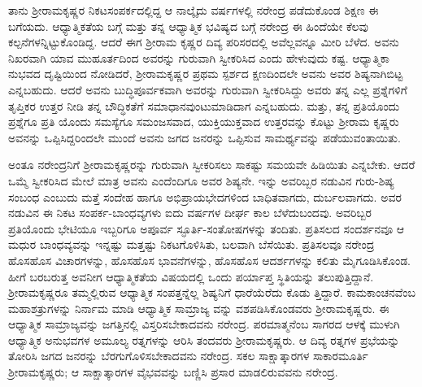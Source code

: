 ತಾನು ಶ್ರೀರಾಮಕೃಷ್ಣರ ನಿಕಟಸಂಪರ್ಕದಲ್ಲಿದ್ದ ಆ ನಾಲ್ಕೈದು ವರ್ಷಗಳಲ್ಲಿ ನರೇಂದ್ರ ಪಡೆದುಕೊಂಡ ಶಿಕ್ಷಣ ಈ ಬಗೆಯದು. ಆಧ್ಯಾತ್ಮಿಕತೆಯ ಬಗ್ಗೆ ಮತ್ತು ತನ್ನ ಆಧ್ಯಾತ್ಮಿಕ ಭವಿಷ್ಯದ ಬಗ್ಗೆ ನರೇಂದ್ರ ಈ ಹಿಂದೆಯೇ ಕೆಲವು ಕಲ್ಪನೆಗಳನ್ನಿಟ್ಟುಕೊಂಡಿದ್ದ. ಆದರೆ ಈಗ ಶ್ರೀರಾಮ ಕೃಷ್ಣರ ದಿವ್ಯ ಪರಿಸರದಲ್ಲಿ ಅವೆಲ್ಲವನ್ನೂ ಮೀರಿ ಬೆಳೆದ. ಅವನು ನಿಖರವಾಗಿ ಯಾವ ಮುಹೂರ್ತದಿಂದ ಅವರನ್ನು ಗುರುವಾಗಿ ಸ್ವೀಕರಿಸಿದ ಎಂದು ಹೇಳುವುದು ಕಷ್ಟ. ಆಧ್ಯಾತ್ಮಿಕಾ ನುಭವದ ದೃಷ್ಟಿಯಿಂದ ನೋಡಿದರೆ, ಶ್ರೀರಾಮಕೃಷ್ಣರ ಪ್ರಥಮ ಸ್ಪರ್ಶದ ಕ್ಷಣದಿಂದಲೇ ಅವನು ಅವರ ಶಿಷ್ಯನಾಗಿಬಿಟ್ಟ ಎನ್ನಬಹುದು. ಆದರೆ ಅವನು ಬುದ್ಧಿಪೂರ್ವಕವಾಗಿ ಅವರನ್ನು ಗುರುವಾಗಿ ಸ್ವೀಕರಿಸಿದ್ದು ಅವರು ತನ್ನ ಎಲ್ಲ ಪ್ರಶ್ನೆಗಳಿಗೆ ತೃಪ್ತಿಕರ ಉತ್ತರ ನೀಡಿ ತನ್ನ ಬೌದ್ಧಿಕತೆಗೆ ಸಮಾಧಾನವುಂಟುಮಾಡಿದಾಗ ಎನ್ನಬಹುದು. ಮತ್ತು, ತನ್ನ ಪ್ರತಿಯೊಂದು ಪ್ರಶ್ನೆಗೂ ಪ್ರತಿ ಯೊಂದು ಸಮಸ್ಯೆಗೂ ಸಮಂಜಸವಾದ, ಯುಕ್ತಿಯುಕ್ತವಾದ ಉತ್ತರವನ್ನು ಕೊಟ್ಟು ಶ್ರೀರಾಮ ಕೃಷ್ಣರು ಅವನನ್ನು ಒಪ್ಪಿಸಿದ್ದರಿಂದಲೇ ಮುಂದೆ ಅವನು ಜಗದ ಜನರನ್ನು ಒಪ್ಪಿಸುವ ಸಾಮರ್ಥ್ಯವನ್ನು ಪಡೆಯುವಂತಾಯಿತು.

ಅಂತೂ ನರೇಂದ್ರನಿಗೆ ಶ್ರೀರಾಮಕೃಷ್ಣರನ್ನು ಗುರುವಾಗಿ ಸ್ವೀಕರಿಸಲು ಸಾಕಷ್ಟು ಸಮಯವೇ ಹಿಡಿಯಿತು ಎನ್ನಬೇಕು. ಆದರೆ ಒಮ್ಮೆ ಸ್ವೀಕರಿಸಿದ ಮೇಲೆ ಮಾತ್ರ ಅವನು ಎಂದೆಂದಿಗೂ ಅವರ ಶಿಷ್ಯನೇ. ಇನ್ನು ಅವರಿಬ್ಬರ ನಡುವಿನ ಗುರು-ಶಿಷ್ಯ ಸಂಬಂಧ ಎಂಬುದು ಮತ್ತೆ ಸಂದೇಹ ಹಾಗೂ ಅಭಿಪ್ರಾಯಭೇದಗಳಿಂದ ಬಾಧಿತವಾಗದು, ದುರ್ಬಲವಾಗದು. ಅವರ ನಡುವಿನ ಈ ನಿಕಟ ಸಂಪರ್ಕ-ಬಾಂಧವ್ಯಗಳು ಐದು ವರ್ಷಗಳ ದೀರ್ಘ ಕಾಲ ಬೆಳೆದುಬಂದವು. ಅವರಿಬ್ಬರ ಪ್ರತಿಯೊಂದು ಭೇಟಿಯೂ ಇಬ್ಬರಿಗೂ ಅಪೂರ್ವ ಸ್ಫೂರ್ತಿ-ಸಂತೋಷಗಳನ್ನು ತಂದಿತು. ಪ್ರತಿಸಲದ ಸಂದರ್ಶನವೂ ಆ ಮಧುರ ಬಾಂಧವ್ಯವನ್ನು ಇನ್ನಷ್ಟು ಮತ್ತಷ್ಟು ನಿಕಟಗೊಳಿಸಿತು, ಬಲವಾಗಿ ಬೆಸೆಯಿತು. ಪ್ರತಿಸಲವೂ ನರೇಂದ್ರ ಹೊಸಹೊಸ ವಿಚಾರಗಳನ್ನು, ಹೊಸಹೊಸ ಭಾವನೆಗಳನ್ನು, ಹೊಸಹೊಸ ಆದರ್ಶಗಳನ್ನು ಕಲಿತು ಮೈಗೂಡಿಸಿಕೊಂಡ. ಹೀಗೆ ಬರಬರುತ್ತ ಅವನೀಗ ಆಧ್ಯಾತ್ಮಿಕತೆಯ ವಿಷಯದಲ್ಲಿ ಒಂದು ಪರ್ಯಾಪ್ತ ಸ್ಥಿತಿಯನ್ನು ತಲುಪುತ್ತಿದ್ದಾನೆ. ಶ್ರೀರಾಮಕೃಷ್ಣರೂ ತಮ್ಮಲ್ಲಿರುವ ಆಧ್ಯಾತ್ಮಿಕ ಸಂಪತ್ತನ್ನೆಲ್ಲ ಶಿಷ್ಯನಿಗೆ ಧಾರೆಯೆರೆದು ಕೊಡು ತ್ತಿದ್ದಾರೆ. ಕಾಮಕಾಂಚನವೆಂಬ ಮಹಾಶತ್ರುಗಳನ್ನು ನಿರ್ನಾಮ ಮಾಡಿ ಆಧ್ಯಾತ್ಮಿಕ ಸಾಮ್ರಾಜ್ಯ ವನ್ನು ವಶಪಡಿಸಿಕೊಂಡವರು ಶ್ರೀರಾಮಕೃಷ್ಣರು. ಈ ಆಧ್ಯಾತ್ಮಿಕ ಸಾಮ್ರಾಜ್ಯವನ್ನು ಜಗತ್ತಿನಲ್ಲಿ ವಿಸ್ತರಿಸಬೇಕಾದವನು ನರೇಂದ್ರ. ಪರಮಾತ್ಮನೆಂಬ ಸಾಗರದ ಆಳಕ್ಕೆ ಮುಳುಗಿ ಆಧ್ಯಾತ್ಮಿಕ ಅನುಭವಗಳ ಅಮೂಲ್ಯ ರತ್ನಗಳನ್ನು ಆರಿಸಿ ತಂದವರು ಶ್ರೀರಾಮಕೃಷ್ಣರು. ಆ ದಿವ್ಯ ರತ್ನಗಳ ಪ್ರಭೆಯನ್ನು ತೋರಿಸಿ ಜಗದ ಜನರನ್ನು ಬೆರಗುಗೊಳಿಸಬೇಕಾದವನು ನರೇಂದ್ರ. ಸಕಲ ಸಾಕ್ಷಾತ್ಕಾರಗಳ ಸಾಕಾರಮೂರ್ತಿ ಶ್ರೀರಾಮಕೃಷ್ಣರು; ಆ ಸಾಕ್ಷಾತ್ಕಾರಗಳ ವೈಭವವನ್ನು ಬಣ್ಣಿಸಿ ಪ್ರಸಾರ ಮಾಡಲಿರುವವನು ನರೇಂದ್ರ.


